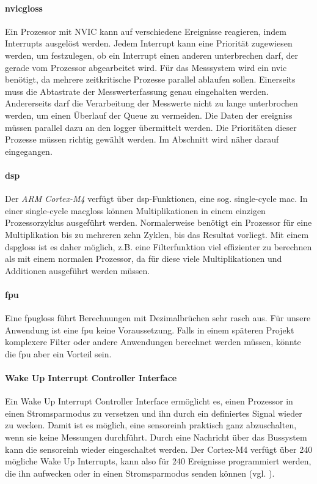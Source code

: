 \paragraph{\gls{nvicgloss}} Ein Prozessor mit NVIC kann auf verschiedene Ereignisse reagieren, indem Interrupts ausgelöst werden. Jedem Interrupt kann eine Priorität zugewiesen werden, um festzulegen, ob ein Interrupt einen anderen unterbrechen darf, der gerade vom Prozessor abgearbeitet wird. Für das Messsystem wird ein \gls{nvic} benötigt, da mehrere zeitkritische Prozesse parallel ablaufen sollen. Einerseits muss die Abtastrate der Messwerterfassung genau eingehalten werden. Andererseits darf die Verarbeitung der Messwerte nicht zu lange unterbrochen werden, um einen Überlauf der Queue zu vermeiden. Die Daten der \glspl{ereignis} müssen parallel dazu an den \gls{logger} übermittelt werden. Die Prioritäten dieser Prozesse müssen richtig gewählt werden. Im Abschnitt  wird näher darauf eingegangen.

\paragraph{\gls{dsp}} Der \emph{ARM Cortex-M4} verfügt über \gls{dsp}-Funktionen, eine sog. single-cycle \gls{mac}. In einer single-cycle \gls{macgloss} können Multiplikationen in einem einzigen Prozessorzyklus ausgeführt werden. Normalerweise benötigt ein Prozessor für eine Multiplikation bis zu mehreren zehn Zyklen, bis das Resultat vorliegt. Mit einem \gls{dspgloss} ist es daher möglich, z.B. eine Filterfunktion viel effizienter zu berechnen als mit einem normalen Prozessor, da für diese viele Multiplikationen und Additionen ausgeführt werden müssen.

\paragraph{\gls{fpu}} Eine \gls{fpugloss} führt Berechnungen mit Dezimalbrüchen sehr rasch aus. Für unsere Anwendung ist eine \gls{fpu} keine Voraussetzung. Falls in einem späteren Projekt komplexere Filter oder andere Anwendungen berechnet werden müssen, könnte die \gls{fpu} aber ein Vorteil sein.

\paragraph{Wake Up Interrupt Controller Interface} Ein Wake Up Interrupt Controller Interface ermöglicht es, einen Prozessor in einen Stromsparmodus zu versetzen und ihn durch ein definiertes Signal wieder zu wecken. Damit ist es möglich, eine \gls{sensoreinh} praktisch ganz abzuschalten, wenn sie keine Messungen durchführt. Durch eine Nachricht über das Bussystem kann die \gls{sensoreinh} wieder eingeschaltet werden. Der Cortex-M4 verfügt über 240 mögliche Wake Up Interrupts, kann also für 240 Ereignisse programmiert werden, die ihn aufwecken oder in einen Stromsparmodus senden können (vgl. \cite{armcortex}).

